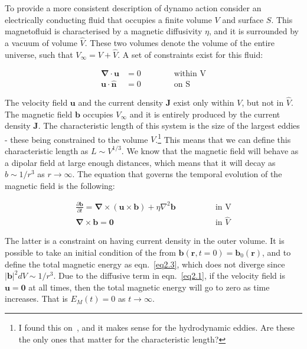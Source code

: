 \documentclass[a4paper,12pt]{article}
\begin{document}
To provide a more consistent description of dynamo action consider an electrically conducting fluid that occupies a finite volume $V$ and surface $S$. This magnetofluid is characterised by a magnetic diffusivity $\eta$, and it is surrounded by a vacuum of volume $\hat{V}$. These two volumes denote the volume of the entire universe, such that $V_\infty = V + \hat{V}$. A set of constraints exist for this fluid:

\begin{align}
 \bm \nabla \cdot \bm u &= 0 \qquad \qquad \text{within V} \nonumber\\
 \bm u \cdot \bm{\hat{n}} &= 0 \qquad \qquad \text{on S} \nonumber
\end{align}

The velocity field $\bm u$ and the current density $\bm J$ exist only within $V$, but not in $\hat{V}$. The magnetic field $\bm b$ occupies $V_\infty$ and it is entirely produced by the current density $\bm J$. The characteristic length of this system is the size of the largest eddies - these being constrained to the volume $V$.\footnote{I found this on~\cite{schnack2009lectures}, and it makes sense for the hydrodynamic eddies. Are these the only ones that matter for the characteristic length?} This means that we can define this characteristic length as $L \sim V^{1/3}$. We know that the magnetic field will behave as a dipolar field at large enough distances, which means that it will decay as $b \sim 1/r^3$ as $r \rightarrow \infty$. The equation that governs the temporal evolution of the magnetic field is the following: 

\begin{align}
 \frac{\partial \bm b}{\partial t} = \bm \nabla \times (\bm u \times \bm b) + \eta \nabla^2 \bm b \qquad \qquad &\text{in V}
 \label{eq2.1} \\
 \bm \nabla \times \bm b = \bm 0 \qquad \qquad &\text{in $\hat{V}$} \label{eq2.2}
\end{align}

The latter is a constraint on having current density in the outer volume. It is possible to take an initial condition of the from $\bm b(\bm r, t=0) = \bm b_0(\bm r)$, and to define the total magnetic energy as eqn.~\ref{eq2.3}, which does not diverge since $\vert \bm b \vert^2 dV \sim 1/r^3$. Due to the diffusive term in eqn.~\ref{eq2.1}, if the velocity field is $\bm u = \bm 0$ at all times, then the total magnetic energy will go to zero as time increases. That is $E_M(t) = 0$ as $t \rightarrow \infty$.
\end{document}
